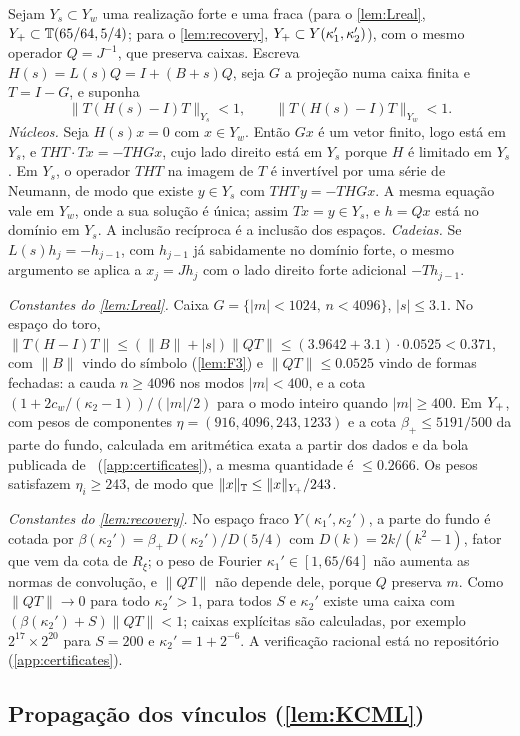 Sejam $Y_s\subset Y_w$ uma realização forte e uma fraca (para o \cref{lem:Lreal}, $Y_{+}\subset\mathbb T(65/64,5/4)$;
para o \cref{lem:recovery}, $Y_{+}\subset Y(\kappa_1',\kappa_2')$), com o mesmo operador $Q=J^{-1}$, que preserva
caixas. Escreva $H(s)=L(s)Q=I+(B+s)Q$, seja $G$ a projeção numa caixa finita e $T=I-G$, e suponha
\[
  \|T(H(s)-I)T\|_{Y_s}<1,\qquad \|T(H(s)-I)T\|_{Y_w}<1 .
\]
\emph{Núcleos.} Seja $H(s)x=0$ com $x\in Y_w$. Então $Gx$ é um vetor finito, logo está em $Y_s$, e
$THT\cdot Tx=-THGx$, cujo lado direito está em $Y_s$ porque $H$ é limitado em $Y_s$. Em $Y_s$, o operador $THT$ na
imagem de $T$ é invertível por uma série de Neumann, de modo que existe $y\in Y_s$ com $THT\,y=-THGx$. A mesma equação vale
em $Y_w$, onde a sua solução é única; assim $Tx=y\in Y_s$, e $h=Qx$ está no domínio em $Y_s$. A inclusão
recíproca é a inclusão dos espaços. \emph{Cadeias.} Se $L(s)h_j=-h_{j-1}$, com $h_{j-1}$ já sabidamente no
domínio forte, o mesmo argumento se aplica a $x_j=Jh_j$ com o lado direito forte adicional $-Th_{j-1}$.

\emph{Constantes do \cref{lem:Lreal}.} Caixa $G=\{|m|<1024,\,n<4096\}$, $|s|\le3.1$. No espaço do toro,
$\|T(H-I)T\|\le(\|B\|+|s|)\|QT\|\le(3.9642+3.1)\cdot0.0525<0.371$, com $\|B\|$ vindo do símbolo (\cref{lem:F3}) e
$\|QT\|\le0.0525$ vindo de formas fechadas: a cauda $n\ge4096$ nos modos $|m|<400$, e a cota
$(1+2c_w/(\kappa_2-1))/(|m|/2)$ para o modo inteiro quando $|m|\ge400$. Em $Y_{+}$, com pesos de componentes
$\eta=(916,4096,243,1233)$ e a cota $\beta_+\le5191/500$ da parte do fundo, calculada em aritmética
exata a partir dos dados e da bola publicada de~\cite{RT2019} (\cref{app:certificates}), a mesma quantidade é
$\le0.2666$. Os pesos satisfazem $\eta_i\ge243$, de modo que $\|x\|_{\mathbb T}\le\|x\|_{Y_{+}}/243$.

\emph{Constantes do \cref{lem:recovery}.} No espaço fraco $Y(\kappa_1',\kappa_2')$, a parte do fundo é cotada por
$\beta(\kappa_2')=\beta_+\,D(\kappa_2')/D(5/4)$ com $D(k)=2k/(k^2-1)$, fator que vem da cota de $R_\xi$; o
peso de Fourier $\kappa_1'\in[1,65/64]$ não aumenta as normas de convolução, e $\|QT\|$ não depende dele,
porque $Q$ preserva $m$. Como $\|QT\|\to0$ para todo $\kappa_2'>1$, para todos $S$ e $\kappa_2'$ existe uma caixa com
$(\beta(\kappa_2')+S)\|QT\|<1$; caixas explícitas são calculadas, por exemplo $2^{17}\times2^{20}$ para $S=200$ e
$\kappa_2'=1+2^{-6}$. A verificação racional está no repositório (\cref{app:certificates}).

\subsection{Propagação dos vínculos (\cref{lem:KCML})}\label{app:KCML}

